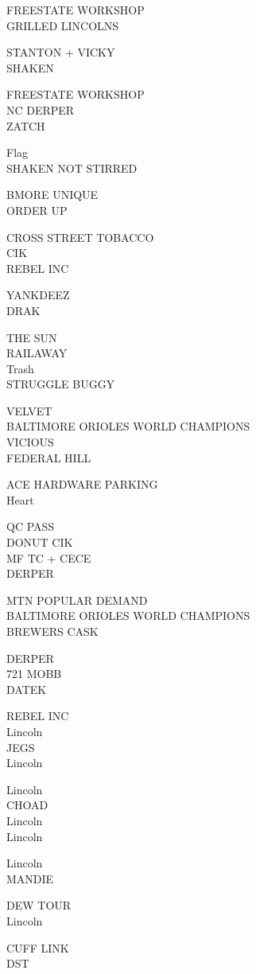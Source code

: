 \documentclass[10pt,letterpaper]{article}
\begin{document}
FREESTATE WORKSHOP\\
GRILLED LINCOLNS

STANTON + VICKY\\
SHAKEN

FREESTATE WORKSHOP\\
NC DERPER\\
ZATCH

Flag\\
SHAKEN NOT STIRRED

BMORE UNIQUE\\
ORDER UP

CROSS STREET TOBACCO\\
CIK\\
REBEL INC

YANKDEEZ\\
DRAK

THE SUN\\
RAILAWAY\\
Trash\\
STRUGGLE BUGGY

VELVET\\
BALTIMORE ORIOLES WORLD CHAMPIONS\\
VICIOUS\\
FEDERAL HILL

ACE HARDWARE PARKING\\
Heart

QC PASS\\
DONUT CIK\\
MF TC + CECE\\
DERPER

MTN POPULAR DEMAND\\
BALTIMORE ORIOLES WORLD CHAMPIONS\\
BREWERS CASK

DERPER\\
721 MOBB\\
DATEK

REBEL INC\\
Lincoln\\
JEGS\\
Lincoln

Lincoln\\
CHOAD\\
Lincoln\\
Lincoln

Lincoln\\
MANDIE

DEW TOUR\\
Lincoln

CUFF LINK\\
DST
\end{document}
